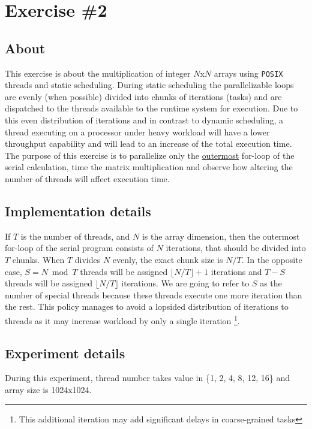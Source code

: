 \documentclass{article}
\begin{document}
\section{Exercise \#2}

\subsection{About}
This exercise is about the multiplication of integer $N$x$N$ arrays using \texttt{POSIX} threads
and static scheduling. During static scheduling the parallelizable loops are evenly (when
possible) divided into chunks of iterations (tasks) and are dispatched to the threads available
to the runtime system for execution. Due to this even distribution of iterations and in contrast
to dynamic scheduling, a thread executing on a processor under heavy workload will have a lower
throughput capability and will lead to an increase of the total execution time. The purpose of
this exercise is to parallelize only the \underline{outermost} for-loop of the serial calculation,
time the matrix multiplication and observe how altering the number of threads will affect execution
time.

\subsection{Implementation details}
If $T$ is the number of threads, and $N$ is the array dimension, then the outermost
for-loop of the serial program consists of $N$ iterations, that should be divided
into $T$ chunks. When $T$ divides $N$ evenly, the exact chunk size is $N/T$. In the
opposite case, $S=N \bmod T$ threads will be assigned $\lfloor{N/T}\rfloor+1$ iterations
and $T-S$ threads will be assigned $\lfloor{N/T}\rfloor$ iterations. We are going
to refer to $S$ as the number of special threads because these threads execute one
more iteration than the rest. This policy manages to avoid a lopsided distribution
of iterations to threads as it may increase workload by only a single iteration
\footnote{This additional iteration may add significant delays in coarse-grained
tasks}.

\newpage

\subsection{Experiment details}
During this experiment, thread number takes value in \{1, 2, 4, 8, 12, 16\} and array
size is 1024x1024.
\end{document}
